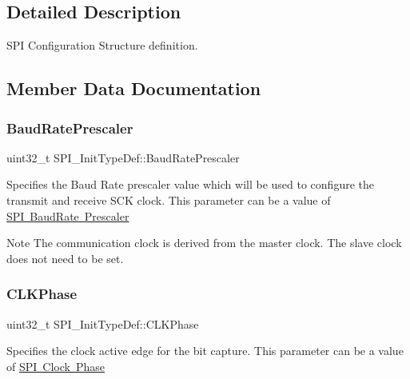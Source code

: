 \subsection{Detailed Description}
S\+PI Configuration Structure definition. 

\subsection{Member Data Documentation}
\mbox{\label{struct_s_p_i___init_type_def_a1d553f90738cb633a9298d2b4d306fde}} 
\subsubsection{\texorpdfstring{BaudRatePrescaler}{BaudRatePrescaler}}
{\footnotesize\ttfamily uint32\+\_\+t S\+P\+I\+\_\+\+Init\+Type\+Def\+::\+Baud\+Rate\+Prescaler}

Specifies the Baud Rate prescaler value which will be used to configure the transmit and receive S\+CK clock. This parameter can be a value of \mbox{\hyperlink{group___s_p_i___baud_rate___prescaler}{S\+PI Baud\+Rate Prescaler}} \begin{DoxyNote}{Note}
The communication clock is derived from the master clock. The slave clock does not need to be set. 
\end{DoxyNote}
\mbox{\label{struct_s_p_i___init_type_def_ab21a458209f2588f49a2353c56f62625}} 
\subsubsection{\texorpdfstring{CLKPhase}{CLKPhase}}
{\footnotesize\ttfamily uint32\+\_\+t S\+P\+I\+\_\+\+Init\+Type\+Def\+::\+C\+L\+K\+Phase}

Specifies the clock active edge for the bit capture. This parameter can be a value of \mbox{\hyperlink{group___s_p_i___clock___phase}{S\+PI Clock Phase}} \mbox{\label{struct_s_p_i___init_type_def_a96922c7ff9e589ebd9611fc4ab730454}} 
